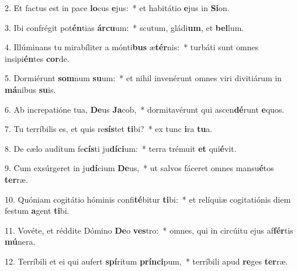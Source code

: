 2. Et factus est in pace \textbf{lo}cus \textbf{e}jus:~*  et habitátio \textbf{e}jus in \textbf{Si}on.\

3. Ibi confrégit pot\textbf{én}tias \textbf{ár}\textbf{cu}um:~*  scutum, gládi\textbf{um}, et \textbf{bel}lum.\

4. Illúminans tu mirabíliter a mónti\textbf{bus} æ\textbf{tér}nis:~*  turbáti sunt omnes insipi\textbf{én}tes \textbf{cor}de.\

5. Dormiérunt \textbf{som}num \textbf{su}um:~*  et nihil invenérunt omnes viri divitiárum in \textbf{má}nibus \textbf{su}is.\

6. Ab increpatióne tua, \textbf{De}us \textbf{Ja}cob,~*  dormitavérunt qui ascen\textbf{dé}runt \textbf{e}quos.\

7. Tu terríbilis es, et quis re\textbf{sís}tet \textbf{ti}bi?~*  ex tunc \textbf{i}ra \textbf{tu}a.\

8. De cælo audítum fe\textbf{cís}ti ju\textbf{dí}\textbf{ci}um:~*  terra trémuit \textbf{et} qui\textbf{é}vit.\

9. Cum exsúrgeret in ju\textbf{dí}cium \textbf{De}us,~*  ut salvos fáceret omnes mansu\textbf{é}tos \textbf{ter}ræ.\

10. Quóniam cogitátio hóminis confi\textbf{té}bitur \textbf{ti}bi:~*  et relíquiæ cogitatiónis diem festum \textbf{a}gent \textbf{ti}bi.\

11. Vovéte, et réddite Dómino \textbf{De}o \textbf{ves}tro:~*  omnes, qui in circúitu ejus af\textbf{fér}tis \textbf{mú}nera.\

12. Terríbili et ei qui aufert \textbf{spí}ritum \textbf{prín}\textbf{ci}pum,~*  terríbili apud \textbf{re}ges \textbf{ter}ræ.\

